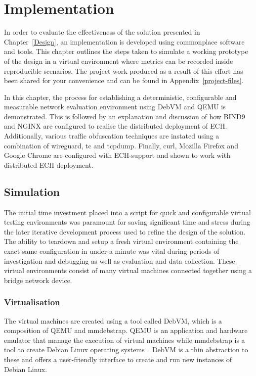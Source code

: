\chapter{Implementation}\label{Implementation}

In order to evaluate the effectiveness of the solution presented in Chapter~\ref{Design}, an implementation is developed using commonplace software and tools. This chapter outlines the steps taken to simulate a working prototype of the design in a virtual environment where metrics can be recorded inside reproducible scenarios. The project work produced as a result of this effort has been shared for your convenience and can be found in Appendix~\ref{project-files}.

In this chapter, the process for establishing a deterministic, configurable and measurable network evaluation environment using DebVM and QEMU is demonstrated. This is followed by an explanation and discussion of how BIND9 and NGINX are configured to realise the distributed deployment of ECH. Additionally, various traffic obfuscation techniques are instated using a combination of wireguard, tc and tcpdump. Finally, curl, Mozilla Firefox and Google Chrome are configured with ECH-support and shown to work with distributed ECH deployment.








\section{Simulation}

The initial time investment placed into a script for quick and configurable virtual testing environments was paramount for saving significant time and stress during the later iterative development process used to refine the design of the solution. The ability to teardown and setup a fresh virtual environment containing the exact same configuration in under a minute was vital during periods of investigation and debugging as well as evaluation and data collection. These virtual environments consist of many virtual machines connected together using a bridge network device.

\subsection{Virtualisation}

The virtual machines are created using a tool called DebVM, which is a composition of QEMU and mmdebstrap. QEMU is an application and hardware emulator that manage the execution of virtual machines while mmdebstrap is a tool to create Debian Linux operating systems~\cite{bellard2005qemu}. DebVM is a thin abstraction to these and offers a user-friendly interface to create and run new instances of Debian Linux.

